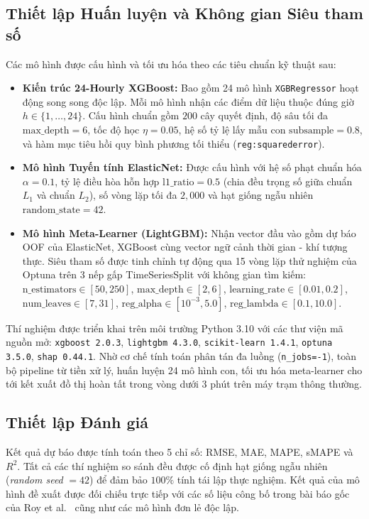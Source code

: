 \subsection{Thiết lập Huấn luyện và Không gian Siêu tham số}
Các mô hình được cấu hình và tối ưu hóa theo các tiêu chuẩn kỹ thuật sau:
\begin{itemize}
    \item \textbf{Kiến trúc 24-Hourly XGBoost:} Bao gồm 24 mô hình \texttt{XGBRegressor} hoạt động song song độc lập. Mỗi mô hình nhận các điểm dữ liệu thuộc đúng giờ $h \in \{1, \dots, 24\}$. Cấu hình chuẩn gồm $200$ cây quyết định, độ sâu tối đa $\text{max\_depth} = 6$, tốc độ học $\eta = 0.05$, hệ số tỷ lệ lấy mẫu con $\text{subsample} = 0.8$, và hàm mục tiêu hồi quy bình phương tối thiểu (\texttt{reg:squarederror}).
    \item \textbf{Mô hình Tuyến tính ElasticNet:} Được cấu hình với hệ số phạt chuẩn hóa $\alpha = 0.1$, tỷ lệ điều hòa hỗn hợp $\text{l1\_ratio} = 0.5$ (chia đều trọng số giữa chuẩn $L_1$ và chuẩn $L_2$), số vòng lặp tối đa $2,000$ và hạt giống ngẫu nhiên $\text{random\_state} = 42$.
    \item \textbf{Mô hình Meta-Learner (LightGBM):} Nhận vector đầu vào gồm dự báo OOF của ElasticNet, XGBoost cùng vector ngữ cảnh thời gian - khí tượng thực. Siêu tham số được tinh chỉnh tự động qua 15 vòng lặp thử nghiệm của Optuna trên 3 nếp gấp TimeSeriesSplit với không gian tìm kiếm: $\text{n\_estimators} \in [50, 250]$, $\text{max\_depth} \in [2, 6]$, $\text{learning\_rate} \in [0.01, 0.2]$, $\text{num\_leaves} \in [7, 31]$, $\text{reg\_alpha} \in [10^{-3}, 5.0]$, $\text{reg\_lambda} \in [0.1, 10.0]$.
\end{itemize}

Thí nghiệm được triển khai trên môi trường Python 3.10 với các thư viện mã nguồn mở: \texttt{xgboost 2.0.3}, \texttt{lightgbm 4.3.0}, \texttt{scikit-learn 1.4.1}, \texttt{optuna 3.5.0}, \texttt{shap 0.44.1}. Nhờ cơ chế tính toán phân tán đa luồng (\texttt{n\_jobs=-1}), toàn bộ pipeline từ tiền xử lý, huấn luyện 24 mô hình con, tối ưu hóa meta-learner cho tới kết xuất đồ thị hoàn tất trong vòng dưới 3 phút trên máy trạm thông thường.

\subsection{Thiết lập Đánh giá}
Kết quả dự báo được tính toán theo 5 chỉ số: RMSE, MAE, MAPE, sMAPE và $R^2$. Tất cả các thí nghiệm so sánh đều được cố định hạt giống ngẫu nhiên (\textit{random seed} $= 42$) để đảm bảo $100\%$ tính tái lập thực nghiệm. Kết quả của mô hình đề xuất được đối chiếu trực tiếp với các số liệu công bố trong bài báo gốc của Roy et al.~\cite{roy2025hourly} cũng như các mô hình đơn lẻ độc lập.
